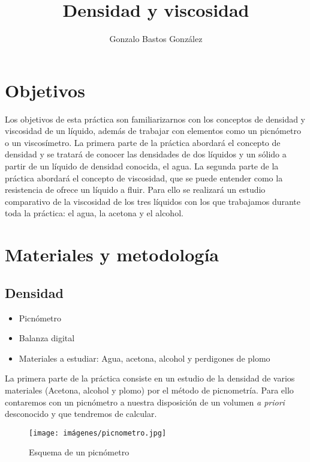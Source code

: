 \documentclass[a4paper,12pt,titlepage]{article}
\title{Densidad y viscosidad}
\author{Gonzalo Bastos González}
\begin{document}
\maketitle

\tableofcontents
\newpage


\section{Objetivos}

Los objetivos de esta práctica son familiarizarnos con los conceptos de densidad y viscosidad de un líquido, además de trabajar con elementos como un picnómetro o un viscosímetro. La primera parte de la práctica abordará el concepto de densidad y se tratará de conocer las densidades de dos líquidos y un sólido a partir de un líquido de densidad conocida, el agua.
La segunda parte de la práctica abordará el concepto de viscosidad, que se puede entender como la resistencia de ofrece un líquido a fluir. Para ello se realizará un estudio comparativo de la viscosidad de los tres líquidos con los que trabajamos durante toda la práctica: el agua, la acetona y el alcohol.

\section{Materiales y metodología}

\subsection{Densidad}

\begin{itemize}
    \item Picnómetro
    \item Balanza digital
    \item Materiales a estudiar: Agua, acetona, alcohol y perdigones de plomo
\end{itemize}

La primera parte de la práctica consiste en un estudio de la densidad de varios materiales (Acetona, alcohol y plomo) por el método de picnometría. Para ello contaremos con un picnómetro a nuestra disposición de un volumen \textit{a priori} desconocido y que tendremos de calcular. 

\begin{figure}[h!]
    \centering
    \texttt{[image: imágenes/picnometro.jpg]}

    \caption{Esquema de un picnómetro}
\end{figure}
\end{document}
